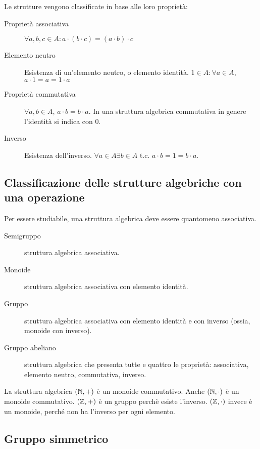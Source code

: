 Le strutture vengono classificate in base alle loro propriet\`a:
\begin{description}
    \item[Propriet\`a associativa\label{itm:strutture_associativa}] $\forall a, b, c \in A : a \cdot (b \cdot c) = (a \cdot b) \cdot c$
    \item[Elemento neutro\label{itm:strutture_neutro}] Esistenza di un'elemento neutro, o elemento identit\`a. $1 \in A : \forall a \in A $, $a \cdot 1 = a = 1 \cdot a$
    \item[Propriet\`a commutativa\label{itm:strutture_commutativa}] $ \forall a, b \in A $, $a \cdot b = b \cdot a $. In una struttura algebrica commutativa in genere l'identit\`a si indica con 0.
    \item[Inverso\label{itm:strutture_inverso}] Esistenza dell'inverso. $ \forall a \in A \exists b \in A $ t.c. $a \cdot b = 1 = b \cdot a $.
\end{description}

\subsection{Classificazione delle strutture algebriche con una operazione}

Per essere studiabile, una struttura algebrica deve essere quantomeno associativa.

\begin{description}
    \item[Semigruppo] struttura algebrica associativa.
    \item[Monoide] struttura algebrica associativa con elemento identit\`a.
    \item[Gruppo] struttura algebrica associativa con elemento identit\`a e con inverso (ossia, monoide con inverso).
    \item[Gruppo abeliano] struttura algebrica che presenta tutte e quattro le propriet\`a: associativa, elemento neutro, commutativa, inverso.
\end{description}

La struttura algebrica $\left( \mathbb{N}, + \right)$ \`e un monoide commutativo. Anche $\left( \mathbb{N}, \cdot \right)$ \`e un monoide commutativo. $\left( \mathbb{Z}, + \right)$ \`e un gruppo perch\`e esiste l'inverso. $\left( \mathbb{Z}, \cdot \right)$ invece \`e un monoide, perch\'e non ha l'inverso per ogni elemento.

\subsection{Gruppo simmetrico\label{subsec:gruppo_simmetrico}}

